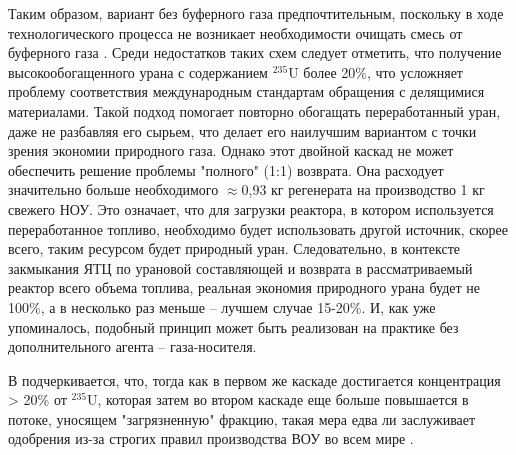 Таким образом,  вариант без буферного газа предпочтительным, поскольку в ходе технологического процесса не возникает необходимости очищать смесь от буферного газа \cite{smirnovKaskadnyeShemyZadachah2012}. Среди недостатков таких схем следует отметить, что получение высокообогащенного урана с содержанием $^{235}$U более 20\%, что усложняет проблему соответствия международным стандартам обращения с делящимися материалами.
Такой подход помогает повторно обогащать переработанный уран, даже не разбавляя его сырьем, что делает его наилучшим вариантом с точки зрения экономии природного газа. Однако этот двойной каскад не может обеспечить решение проблемы "полного" (1:1) возврата. Она расходует значительно больше необходимого $\approx$0,93 кг регенерата на производство 1 кг свежего НОУ. Это означает, что для загрузки реактора, в котором используется переработанное топливо, необходимо будет использовать другой источник, скорее всего, таким ресурсом будет природный уран. Следовательно, в контексте закмыкания ЯТЦ по урановой составляющей и возврата в рассматриваемый реактор всего объема топлива, реальная экономия природного урана будет не 100\%, а в несколько раз меньше -- лучшем случае 15-20\%. И, как уже упоминалось, подобный принцип может быть реализован на практике без дополнительного агента -- газа-носителя.

В \cite{palkinPurificationReprocessedUranium2016} подчеркивается, что, тогда как в первом же каскаде достигается концентрация > 20\% от $^{235}$U, которая затем во втором каскаде еще больше повышается в потоке, уносящем "загрязненную" фракцию, такая мера едва ли заслуживает одобрения из-за строгих правил производства ВОУ во всем мире \cite{ManagementHighEnriched2005}.

